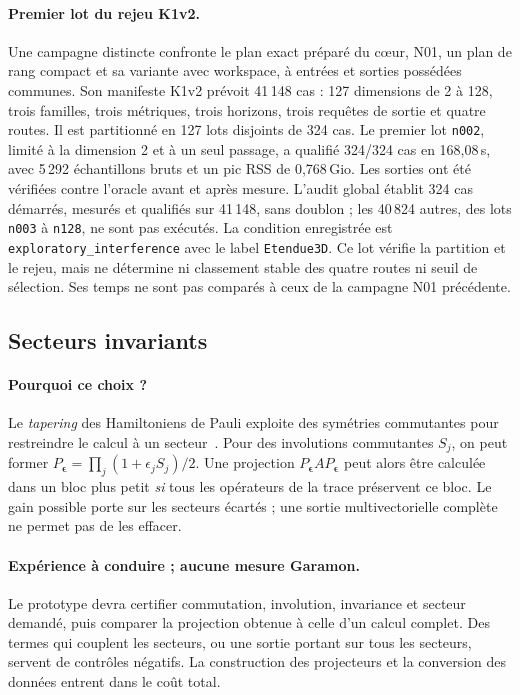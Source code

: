 \documentclass[11pt,a4paper]{article}
\newcommand{\code}[1]{\texttt{#1}}
\begin{document}
\paragraph{Premier lot du rejeu K1v2.}
Une campagne distincte confronte le plan exact préparé du cœur, N01,
un plan de rang compact et sa variante avec workspace, à entrées et
sorties possédées communes. Son manifeste K1v2 prévoit
41\,148 cas : 127 dimensions de 2 à 128, trois familles, trois métriques,
trois horizons, trois requêtes de sortie et quatre routes. Il est
partitionné en 127 lots disjoints de 324 cas. Le premier lot
\code{n002}, limité à la dimension 2 et à un seul passage, a qualifié
324/324 cas en 168,08\,s, avec 5\,292 échantillons bruts et un pic RSS
de 0,768\,Gio. Les sorties ont été vérifiées contre l'oracle avant et
après mesure. L'audit global établit 324 cas démarrés, mesurés et
qualifiés sur 41\,148, sans doublon ; les 40\,824 autres, des lots
\code{n003} à \code{n128}, ne sont pas exécutés.
La condition enregistrée est \code{exploratory\_interference} avec le
label \code{Etendue3D}. Ce lot vérifie la partition et le rejeu,
mais ne détermine ni classement stable des quatre routes ni seuil de
sélection. Ses temps ne sont pas comparés à ceux de la campagne N01
précédente.

\FloatBarrier
\subsection{Secteurs invariants}
\paragraph{Pourquoi ce choix ?}
Le \emph{tapering} des Hamiltoniens de Pauli exploite des symétries
commutantes pour restreindre le calcul à un secteur~\cite{bravyitaper}.
Pour des involutions commutantes $S_j$, on peut former
$P_{\boldsymbol\epsilon}=\prod_j(1+\epsilon_j S_j)/2$.
Une projection $P_{\boldsymbol\epsilon}AP_{\boldsymbol\epsilon}$ peut alors
être calculée dans un bloc plus petit \emph{si} tous les opérateurs de la
trace préservent ce bloc. Le gain possible porte sur les secteurs écartés ;
une sortie multivectorielle complète ne permet pas de les effacer.

\paragraph{Expérience à conduire ; aucune mesure Garamon.}
Le prototype devra certifier commutation, involution, invariance et secteur
demandé, puis comparer la projection obtenue à celle d'un calcul complet.
Des termes qui couplent les secteurs, ou une sortie portant sur tous les
secteurs, servent de contrôles négatifs. La construction des projecteurs et
la conversion des données entrent dans le coût total.
\end{document}
